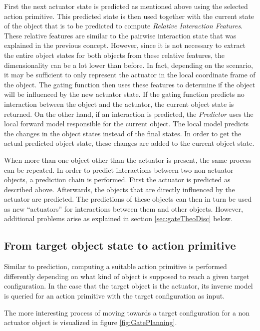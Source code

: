 First the next actuator state is predicted as mentioned above using the selected action primitive.
This predicted state is then used together with the current state of the object that is to be predicted to compute \textit{Relative Interaction Features}. These relative features are similar to the pairwise interaction state that was explained in the previous concept. However, since it is not necessary to extract the entire object states for both objects from these relative features, the dimensionality can be a lot lower than before. In fact, depending on the scenario, it may be sufficient to only represent the actuator in the local coordinate frame of the object. 
The gating function then uses these features to determine if the object will be influenced by the new actuator state. If the gating function predicts no interaction between the object and the actuator, the current object state is returned. 
On the other hand, if an interaction is predicted, the \textit{Predictor} uses the local forward model responsible for the current object. 
The local model predicts the changes in the object states instead of the final states. In order to get the actual predicted object state, these changes are added to the current object state.

When more than one object other than the actuator is present, the same process can be repeated. 
In order to predict interactions between two non actuator objects, a prediction chain is performed. First the actuator is predicted as described above. Afterwards, the objects that are directly influenced by the actuator are predicted. 
The predictions of these objects can then in turn be used as new \enquote{actuators} for interactions between them and other objects. However, additional problems arise as explained in section \ref{sec:gateTheoDisc} below.

\subsection{From target object state to action primitive \label{sec:gatePlanning}}

Similar to prediction, computing a suitable action primitive is performed differently depending on what kind of object is supposed to reach a given target configuration. In the case that the target object is the actuator, its inverse model is queried for an action primitive with the target configuration as input. 

The more interesting process of moving towards a target configuration for a non actuator object is visualized in figure \ref{fig:GatePlanning}.

